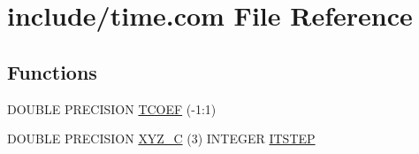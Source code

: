 \hypertarget{home_2abonfi_2_c_f_d__codes_2_eul_f_s_83_84_2include_2time_8com}{\section{include/time.com File Reference}
\label{home_2abonfi_2_c_f_d__codes_2_eul_f_s_83_84_2include_2time_8com}
}
\subsection*{Functions}
\begin{DoxyCompactItemize}
\item 
D\-O\-U\-B\-L\-E P\-R\-E\-C\-I\-S\-I\-O\-N \hyperlink{home_2abonfi_2_c_f_d__codes_2_eul_f_s_83_84_2include_2time_8com_aad879029f2fa532de16a429259050a96}{T\-C\-O\-E\-F} (-\/1\-:1)
\item 
D\-O\-U\-B\-L\-E P\-R\-E\-C\-I\-S\-I\-O\-N \hyperlink{home_2abonfi_2_c_f_d__codes_2_eul_f_s_83_84_2include_2time_8com_aea163e1b1768adcd9e1f052e8e713145}{X\-Y\-Z\-\_\-\-C} (3) I\-N\-T\-E\-G\-E\-R \hyperlink{msa20_2home_2abonfi_2_c_f_d__codes_2_eul_f_s_83_82_83_2include_2time_8com_a11b72cddc58a44173ab90b066363ce9c}{I\-T\-S\-T\-E\-P}
\end{DoxyCompactItemize}
